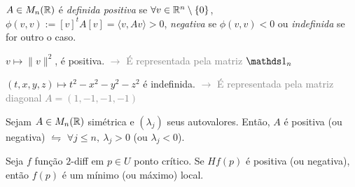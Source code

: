 \begin{definition}
    \(A \in M_{n }(\mathbb{R})\) é \emph{definida positiva} se \(\forall v\in \mathbb{R}^n \setminus \{0\}\), \( \phi (v,v) := [v]^t A [v] =  \langle v, Av\rangle > 0\), \emph{negativa} se \(\phi(v,v)<0\) ou \emph{indefinida} se for outro o caso. 
\end{definition}

\Ei

\begin{example}
    \(v\mapsto \|v\|^2\), é positiva. \textcolor{gray}{\( \rightarrow \) É representada pela matriz \(\id_n\)}   
\end{example}
\begin{example}
    \((t,x,y,z) \mapsto t^2-x^2-y^2-z^2\) é indefinida. \textcolor{gray}{\(\rightarrow\) É representada pela matriz diagonal \(A = (1,-1,-1,-1)\)}
\end{example}
\Ef


\begin{lemma}
    Sejam \(A\in M_n(\mathbb{R})\) simétrica e \((\lambda_j)\) seus autovalores. Então, \(A\) é positiva (ou negativa) \(\leftrightharpoons\) \( \forall j\leq n, \ \lambda_j>0 \) (ou \(\lambda_j <0\)). 
\end{lemma}

\begin{theorem}
    Seja \(f\) função \(2\)-diff em \(p\in U\) ponto crítico. Se \(Hf(p)\) é positiva (ou negativa), então \(f(p)\) é um mínimo (ou máximo) local. 
\end{theorem}

